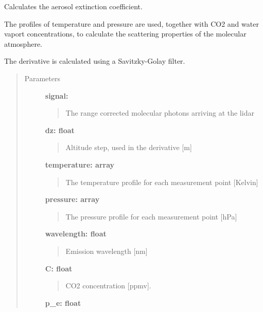 \documentclass[letterpaper,10pt,english]{sphinxmanual}
\begin{document}

\begin{fulllineitems}
\label{hsrl_retrieval:hsrl_retrieval.aerosol_extinction}
Calculates the aerosol extinction coefficient.

The profiles of temperature and pressure are used, together with CO2 and 
water vaport concentrations, to calculate the scattering properties of 
the molecular atmosphere.

The derivative is calculated using a Savitzky-Golay filter.
\begin{quote}\begin{description}
\item[{Parameters}] \leavevmode
\textbf{signal:}
\begin{quote}

The range corrected molecular photons arriving at the lidar
\end{quote}

\textbf{dz: float}
\begin{quote}

Altitude step, used in the derivative {[}m{]}
\end{quote}

\textbf{temperature: array}
\begin{quote}

The temperature profile for each measurement point {[}Kelvin{]}
\end{quote}

\textbf{pressure: array}
\begin{quote}

The pressure profile for each measurement point {[}hPa{]}
\end{quote}

\textbf{wavelength: float}
\begin{quote}

Emission wavelength {[}nm{]}
\end{quote}

\textbf{C: float}
\begin{quote}

CO2 concentration {[}ppmv{]}.
\end{quote}

\textbf{p\_e: float}
\begin{quote}


\end{quote}
\end{description}
\end{quote}
\end{fulllineitems}
\end{document}
